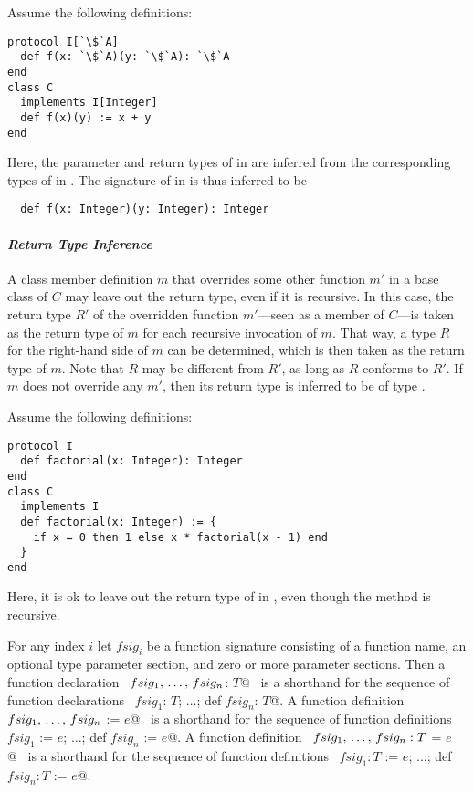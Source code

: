 \example Assume the following definitions:
\begin{lstlisting}[escapechar=`]
protocol I[`\$`A]
  def f(x: `\$`A)(y: `\$`A): `\$`A
end
class C
  implements I[Integer]
  def f(x)(y) := x + y
end
\end{lstlisting}
Here, the parameter and return types of \lstinline@f@ in \lstinline@C@ are
inferred from the corresponding types of \lstinline@f@ in \lstinline@I@. The 
signature of \lstinline@f@ in \lstinline@C@ is thus inferred to be
\begin{lstlisting}
  def f(x: Integer)(y: Integer): Integer
\end{lstlisting}

\paragraph{\em Return Type Inference}
A class member definition $m$ that overrides some other function $m'$ in a base class of $C$ may leave out the return type, even if it is recursive. In this case, the return type $R'$ of the overridden function $m'$---seen as a member of $C$---is taken as the return type of $m$ for each recursive invocation of $m$. That way, a type $R$ for the right-hand side of $m$ can be determined, which is then taken as the return type of $m$. Note that $R$ may be different from $R'$, as long as $R$ conforms to $R'$. If $m$ does not override any $m'$, then its return type is inferred to be of type . 

\example Assume the following definitions:
\begin{lstlisting}
protocol I
  def factorial(x: Integer): Integer
end
class C 
  implements I
  def factorial(x: Integer) := {
    if x = 0 then 1 else x * factorial(x - 1) end
  }
end
\end{lstlisting}
Here, it is ok to leave out the return type of \lstinline@factorial@
in \lstinline@C@, even though the method is recursive. 

For any index $i$ let $fsig_i$ be a function signature consisting of a function
name, an optional type parameter section, and zero or more parameter
sections. Then a function declaration 
~\lstinline@def $fsig_1 ,\, \ldots ,\, fsig_n$: $T$@~ 
is a shorthand for the sequence of function
declarations ~\lstinline@def $fsig_1$: $T$; $\ldots$; def $fsig_n$: $T$@.  
A function definition ~\lstinline@def $fsig_1 ,\, \ldots ,\, fsig_n$ := $e$@~ is a
shorthand for the sequence of function definitions 
~\lstinline@def $fsig_1$ := $e$; $\ldots$; def $fsig_n$ := $e$@.  
A function definition
~\lstinline@def $fsig_1 ,\, \ldots ,\, fsig_n: T$ = $e$@~ is a shorthand for the
sequence of function definitions 
~\lstinline@def $fsig_1: T$ := $e$; $\ldots$; def $fsig_n: T$ := $e$@.






